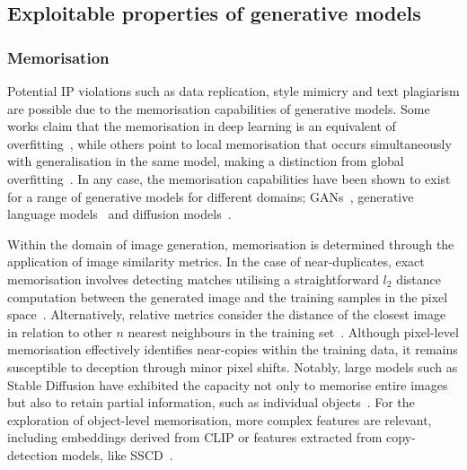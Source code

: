 \documentclass[conference]{IEEEtran}
\begin{document}
\subsection{Exploitable properties of generative models}
\subsubsection{Memorisation}\label{sec:memorisation} 
Potential IP violations such as data replication, style mimicry and text plagiarism are possible due to the memorisation capabilities of generative models. 
Some works claim that the memorisation in deep learning is an equivalent of overfitting~\cite{feldman_does_2020,feldman_what_2020,arpit_closer_2017}, %
while others point to local memorisation that occurs simultaneously with generalisation in the same model, making a distinction from global overfitting~\cite{burg_memorization_2021, tirumala_memorization_2022}. 
In any case, the memorisation capabilities have been shown to exist for a range of generative models for different domains; GANs~\cite{webster_this_2021}, generative language models~\cite{lee_language_2023,jagielski_measuring_2023,carlini_quantifying_2023} and diffusion models~\cite{somepalli_diffusion_2022}.

Within the domain of image generation, memorisation is determined through the application of image similarity metrics. In the case of near-duplicates, exact memorisation involves detecting matches utilising a straightforward $l_2$ distance computation between the generated image and the training samples in the pixel space~\cite{carlini_extracting_2023}. Alternatively, relative metrics consider the distance of the closest image in relation to other $n$ nearest neighbours in the training set~\cite{carlini_extracting_2023, yoon_diffusion_2023, gu_memorization_2023}.
Although pixel-level memorisation effectively identifies near-copies within the training data, it remains susceptible to deception through minor pixel shifts. Notably, large models such as Stable Diffusion have exhibited the capacity not only to memorise entire images but also to retain partial information, such as individual objects~\cite{somepalli_diffusion_2022}.
For the exploration of object-level memorisation, more complex features are relevant, including embeddings derived from CLIP or features extracted from copy-detection models, like SSCD~\cite{radford_learning_2021, pizzi_self-supervised_2022}.
\end{document}
